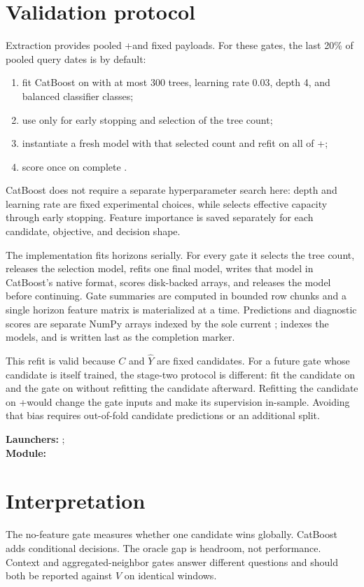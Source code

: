 \documentclass[10pt]{article}
\begin{document}
\section{Validation protocol}
Extraction provides pooled \Tone+\Ttwo and fixed \Tthree payloads. For these
gates, the last 20\% of pooled query dates is \Ttwo by default:
\begin{enumerate}
\item fit CatBoost on \Tone with at most 300 trees, learning rate 0.03,
depth 4, and balanced classifier classes;
\item use \Ttwo only for early stopping and selection of the tree count;
\item instantiate a fresh model with that selected count and refit on all
of \Tone+\Ttwo;
\item score once on complete \Tthree.
\end{enumerate}
CatBoost does not require a separate hyperparameter search here: depth and
learning rate are fixed experimental choices, while \Ttwo selects effective
capacity through early stopping. Feature importance is saved separately for
each candidate, objective, and decision shape.

The implementation fits horizons serially.  For every gate it selects the tree
count, releases the selection model, refits one final model, writes that model
in CatBoost's native format, scores disk-backed arrays, and releases the model
before continuing.  Gate summaries are computed in bounded row chunks and a
single horizon feature matrix is materialized at a time.  Predictions and
diagnostic scores are separate NumPy arrays indexed by the sole current
;  indexes the
models, and  is written last as the completion
marker.

This refit is valid because $C$ and $\widehat Y$ are fixed candidates. For a
future gate whose candidate is itself trained, the stage-two protocol is
different: fit the candidate on \Tone and the gate on \Ttwo without refitting
the candidate afterward. Refitting the candidate on \Tone+\Ttwo would change
the gate inputs and make its \Ttwo supervision in-sample. Avoiding that bias
requires out-of-fold candidate predictions or an additional split.

\textbf{Launchers:} ; \\
\textbf{Module:} 

\section{Interpretation}
The no-feature gate measures whether one candidate wins globally. CatBoost
adds conditional decisions. The oracle gap is headroom, not performance.
Context and aggregated-neighbor gates answer different questions and should
both be reported against $V$ on identical \Tthree windows.
\end{document}
